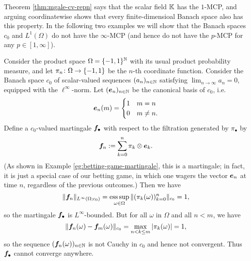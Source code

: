 Theorem \ref{thm:mgale-cv-repn} says that the scalar field $\mathbb{K}$ has the $1$-MCP, and arguing coordinatewise shows that every finite-dimensioal Banach space also has this property.
In the following two examples we will show that the Banach spaces $c_0$ and $L^1(\Omega)$ do not have the $\infty$-MCP (and hence do not have the $p$-MCP for any $p \in [1,\infty]$). 

\begin{example}\label{eg:c0-noMCP}
  Consider the product space $\Omega = \{-1,1\}^{\mathbb{N}}$ with its usual product probability measure, and let $\pi_n \colon \Omega \rightarrow \{-1,1\}$ be the $n$-th coordinate function.
  Consider the Banach space $c_0$ of scalar-valued sequences $(a_n)_{n \in \mathbb{N}}$ satisfying $\lim_{n \to \infty} a_n = 0$, equipped with the $\ell^\infty$-norm.
  Let $(\bm{e}_n)_{n \in \mathbb{N}}$ be the canonical basis of $c_0$, i.e.
  \begin{equation*}
    \bm{e}_n(m) = \begin{cases} 1 & m=n \\ 0 & m \neq n. \end{cases}
  \end{equation*}
  Define a $c_0$-valued martingale $\bm{f}_\bullet$ with respect to the filtration generated by $\pi_{\bullet}$ by
  \begin{equation*}
    \bm{f}_n := \sum_{k = 0}^{n} \pi_k \otimes \bm{e}_k.
  \end{equation*} 
  (As shown in Example \ref{eg:betting-game-martingale}, this is a martingale; in fact, it is just a special case of our betting game, in which one wagers the vector $\bm{e}_n$ at time $n$, regardless of the previous outcomes.)
  Then we have
  \begin{equation*}
    \|\bm{f}_n\|_{L^\infty(\Omega;c_0)} = \operatorname*{ess\,sup}_{\omega \in \Omega} \|(\pi_k(\omega))_{k = 0}^n\|_{c_0} = 1,
  \end{equation*}
  so the martingale $\bm{f}_{\bullet}$ is $L^\infty$-bounded.
  But for all $\omega$ in $\Omega$ and all $n < m$, we have
  \begin{equation*}
    \|\bm{f}_n(\omega) - \bm{f}_m(\omega)\|_{c_0} = \max_{n < k \leq m} |\pi_k(\omega)| = 1,
  \end{equation*}
  so the sequence $(\bm{f}_n(\omega))_{n \in \mathbb{N}}$ is not Cauchy in $c_0$ and hence not convergent.
  Thus $\bm{f}_{\bullet}$ cannot converge anywhere.
\end{example}

